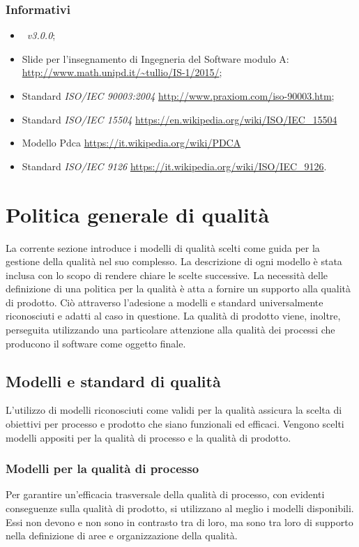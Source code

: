\documentclass[12pt,a4paper]{article}
\begin{document}
	\subsubsection{Informativi}
	\begin{itemize}
		\item \PdP\ \textit{v3.0.0};
		\item Slide per l'insegnamento di Ingegneria del Software modulo A: \url{http://www.math.unipd.it/~tullio/IS-1/2015/};
		\item Standard \textit{ISO/IEC 90003:2004} \url{http://www.praxiom.com/iso-90003.htm};
		\item Standard \textit{ISO/IEC 15504} \url{https://en.wikipedia.org/wiki/ISO/IEC_15504}
		\item Modello Pdca \url{https://it.wikipedia.org/wiki/PDCA}
		\item Standard \textit{ISO/IEC 9126} \url{https://it.wikipedia.org/wiki/ISO/IEC_9126}.
	\end{itemize}
	
	\newpage
	
	\section{Politica generale di qualità}
	
	La corrente sezione introduce i modelli di qualità scelti come guida per la gestione della qualità nel suo complesso. La descrizione di ogni modello è stata inclusa con lo scopo di rendere chiare le scelte successive.
	La necessità delle definizione di una politica per la qualità è atta a fornire un supporto alla qualità di prodotto. Ciò attraverso l'adesione a modelli e standard universalmente riconosciuti e adatti al caso in questione. La qualità di prodotto viene, inoltre, perseguita utilizzando una particolare attenzione alla qualità dei processi che producono il software come oggetto finale.
	
	\subsection{Modelli e standard di qualità}
	L'utilizzo di modelli riconosciuti come validi per la qualità assicura la scelta di obiettivi per processo e prodotto che siano funzionali ed efficaci. Vengono scelti modelli appositi per la qualità di processo e la qualità di prodotto.
	
	\subsubsection{Modelli per la qualità di processo}
	Per garantire un'efficacia trasversale della qualità di processo, con evidenti conseguenze sulla qualità di prodotto, si utilizzano al meglio i modelli disponibili. Essi non devono e non sono  in contrasto tra di loro, ma sono tra loro di supporto nella definizione di aree e organizzazione della qualità.
	
\end{document}
